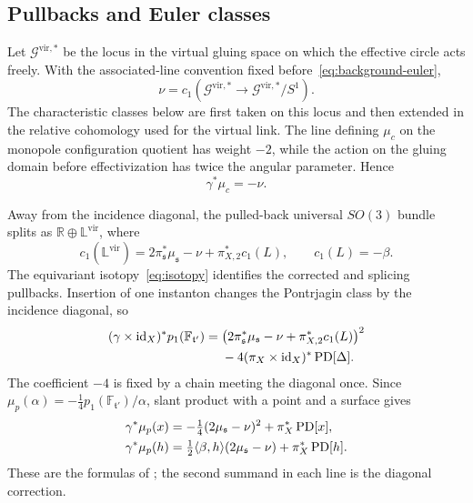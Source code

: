 \documentclass[11pt]{amsart}
\theoremstyle{definition}
\theoremstyle{remark}
\theoremstyle{plain}
\newcommand{\RR}{\mathbb{R}}
\newcommand{\cG}{\mathcal{G}}
\newcommand{\id}{\operatorname{id}}
\begin{document}
\subsection{Pullbacks and Euler classes}
Let $\cG^{\mathrm{vir},*}$ be the locus in the virtual gluing space on
which the effective circle acts freely.  With the associated-line
convention fixed before~\eqref{eq:background-euler},
\begin{equation}\label{eq:nu-definition}
 \nu=c_1(\cG^{\mathrm{vir},*}\longrightarrow
             \cG^{\mathrm{vir},*}/S^1).
\end{equation}
The characteristic classes below are first taken on this locus and then
extended in the relative cohomology used for the virtual link.
The line defining $\mu_c$ on the monopole
configuration quotient has weight $-2$, while the action on the gluing
domain before effectivization has twice the angular parameter.  Hence
\begin{equation}\label{eq:circle-pullback}
 \gamma^*\mu_c=-\nu.
\end{equation}

Away from the incidence diagonal, the pulled-back universal $SO(3)$ bundle
splits as $\RR\oplus\mathbb L^{\mathrm{vir}}$, where
\begin{equation}\label{eq:associated-line-c1}
 c_1(\mathbb L^{\mathrm{vir}})=
 2\pi_{\mathfrak s}^*\mu_{\mathfrak s}-\nu
 +\pi_{X,2}^*c_1(L),\qquad c_1(L)=-\beta.
\end{equation}
The equivariant isotopy~\eqref{eq:isotopy} identifies the corrected and
splicing pullbacks.  Insertion of one instanton changes the Pontrjagin class
by the incidence diagonal, so
\begin{align}\label{eq:universal-p1}
 (\gamma\times\id_X)^*p_1(\mathbb F_{\mathfrak t'})
 ={}&\bigl(2\pi_{\mathfrak s}^*\mu_{\mathfrak s}-\nu
 +\pi_{X,2}^*c_1(L)\bigr)^2\notag\\
 &-4(\pi_X\times\id_X)^*\operatorname{PD}[\Delta].
\end{align}
The coefficient $-4$ is fixed by a chain meeting the diagonal once.  Since
$\mu_p(\alpha)=-\tfrac14p_1(\mathbb F_{\mathfrak t'})/\alpha$, slant product
with a point and a surface gives
\begin{align}\label{eq:mu-pullbacks}
 \gamma^*\mu_p(x)
 &=-\tfrac14(2\mu_{\mathfrak s}-\nu)^2
   +\pi_X^*\operatorname{PD}[x],\notag\\
 \gamma^*\mu_p(h)
 &=\tfrac12\langle\beta,h\rangle
   (2\mu_{\mathfrak s}-\nu)+\pi_X^*\operatorname{PD}[h].
\end{align}
These are the formulas of
\cite[Lemma~4.10]{FeehanLenessLevelOne}; the second summand in each line is
the diagonal correction.
\end{document}
